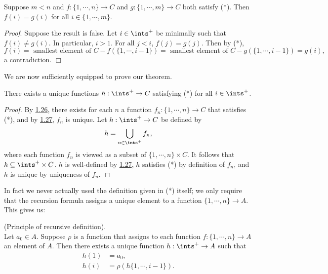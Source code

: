 \begin{lemma}\label{1.27}
    Suppose $m<n$ and $f: \{1,\cdots, n\} \rightarrow C$ and $g: \{1, \cdots, m\} \rightarrow C$ both satisfy (*). Then $f(i) = g(i)$ for all $i \in \{1, \cdots, m\}$.
\end{lemma}
{\it Proof}. Suppose the result is false. Let $i \in \ints^+$ be minimally such that $f(i) \neq g(i)$. In particular, $i > 1$. For all $j < i$, $f(j) = g(j)$. Then by (*),
$$f(i) = \text{ smallest element of }C - f(\{1, \cdots, i-1\}) = \text{ smallest element of }C - g(\{1, \cdots, i-1\}) = g(i),$$
a contradiction. $\Box$

We are now sufficiently equipped to prove our theorem.
\begin{theorem}\label{1.28}
    There exists a unique functions $h: \ints^+ \rightarrow C$ satisfying (*) for all $i \in \ints^+$.
\end{theorem}
{\it Proof.} By \hyperref[1.26]{1.26}, there exists for each $n$ a function $f_n:\{1, \cdots, n\} \rightarrow C$ that satisfies (*), and by \hyperref[1.27]{1.27}, $f_n$ is unique. Let $h: \ints^+ \rightarrow C$ be defined by
$$h = \bigcup_{n \in \ints^+} f_n,$$
where each function $f_n$ is viewed as a subset of $\{1, \cdots, n\} \times C$. It follows that $h \subseteq \ints^+ \times C$. $h$ is well-defined by \hyperref[1.27]{1.27}, $h$ satisfies (*) by definition of $f_n$, and $h$ is unique by uniqueness of $f_n$. $\Box$

In fact we never actually used the definition given in (*) itself; we only require that the recursion formula assigns a unique element to a function $\{1, \cdots, n\} \rightarrow A$. This gives us:
\begin{theorem}\label{1.29}
    (Principle of recursive definition).\\

    Let $a_0 \in A$. Suppose $\rho$ is a function that assigns to each function $f: \{1, \cdots, n\} \rightarrow A$ an element of $A$. Then there exists a unique function $h: \ints^+ \rightarrow A$ such that
    \begin{align*}
        h(1) &= a_0, \\
        h(i) &= \rho(h\{1, \cdots, i-1\}).
    \end{align*}
\end{theorem}

